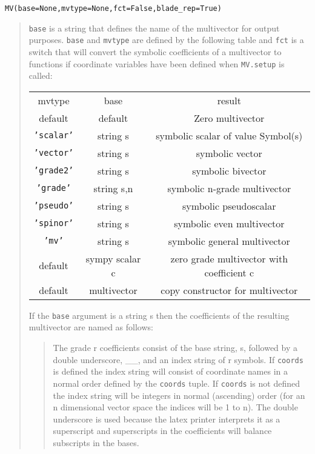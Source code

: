 \documentclass[10pt]{article}
\newcommand{\T}[1]{\texttt{#1}}
\begin{document}
\T{MV(base=None,mvtype=None,fct=False,blade\_rep=True)}
\begin{quote}
   \T{base} is a string that defines the name of the multivector for output
   purposes. \T{base} and  \T{mvtype} are defined by the following table and \T{fct} is a
   switch that will convert the symbolic coefficients of a multivector to functions
   if coordinate variables have been defined when \T{MV.setup} is called:

\begin{center}
   \begin{tabular}{ccc}
    mvtype &  base  &  result \\
         default &  default &  Zero multivector \\
         \T{'scalar'} &  string s &  symbolic scalar of value Symbol(s) \\
         \T{'vector'}  &  string s &  symbolic vector \\
         \T{'grade2'} &  string s &  symbolic bivector \\ 
         \T{'grade'} &  string s,n &  symbolic n-grade multivector \\
         \T{'pseudo'} &  string s &  symbolic pseudoscalar \\
         \T{'spinor'} &  string s &  symbolic even multivector \\ 
         \T{'mv'} & string s &  symbolic general multivector \\
         default &  sympy scalar c &  zero grade multivector with coefficient c \\
         default &  multivector &  copy constructor for multivector 
	\end{tabular}
\end{center}

   If the \T{base} argument is a string s then the coefficients of the resulting
   multivector are named as follows:
   	\begin{quote}
     The grade r coefficients consist of the base string, s, followed by a double
     underscore, \_\_, and an index string of r symbols.  If \T{coords} is defined the
     index string will consist of coordinate names in a normal order defined by
     the \T{coords} tuple.  If \T{coords} is not defined the index string will be
     integers in normal (ascending) order (for an n dimensional vector space the
     indices will be 1 to n).  The double underscore is used because the latex printer
     interprets it as a superscript and superscripts in the coefficients will balance
     subscripts in the bases.


\end{quote}
\end{quote}
\end{document}

